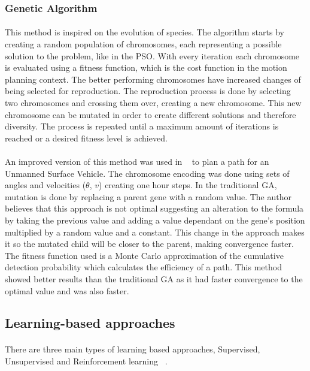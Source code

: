 \subsubsection{Genetic Algorithm}
\label{subsubsec:GA}
\paragraph{}This method is inspired on the evolution of species. The algorithm starts by creating a random population of chromosomes, each representing a 
possible solution to the problem, like in the \gls{PSO}. With every iteration each chromosome is evaluated using a 
fitness function, which is the cost function in the motion planning context. The better performing chromosomes have increased
changes of being selected for reproduction. The reproduction process is done by selecting two chromosomes and crossing them over, creating
a new chromosome. This new chromosome can be mutated in order to create different solutions and therefore diversity. The process is repeated until a maximum amount of iterations
is reached or a desired fitness level is achieved.
\paragraph{}An improved version of this method was used in ~\cite{guo2019optimal} to plan a path for an Unmanned Surface Vehicle. The 
chromosome encoding was done using sets of angles and velocities ($\theta$, $v$) creating one hour steps. In the traditional
GA, mutation is done by replacing a parent gene with a random value. The author believes that this 
approach is not optimal suggesting an alteration to the formula by taking the previous value and adding a 
value dependant on the gene's position multiplied by a random value and a constant. This change in the approach
makes it so the mutated child will be closer to the parent, making convergence faster. The fitness function used
is a Monte Carlo approximation of the cumulative detection probability which calculates the 
efficiency of a path. This method showed better results than the traditional \gls{GA} as it had faster convergence
to the optimal value and was also faster.
\subsection{Learning-based approaches}
\label{subsec:LB}
\paragraph{}There are three main types of learning based approaches, Supervised, Unsupervised and Reinforcement learning ~\cite{MLT1}.
